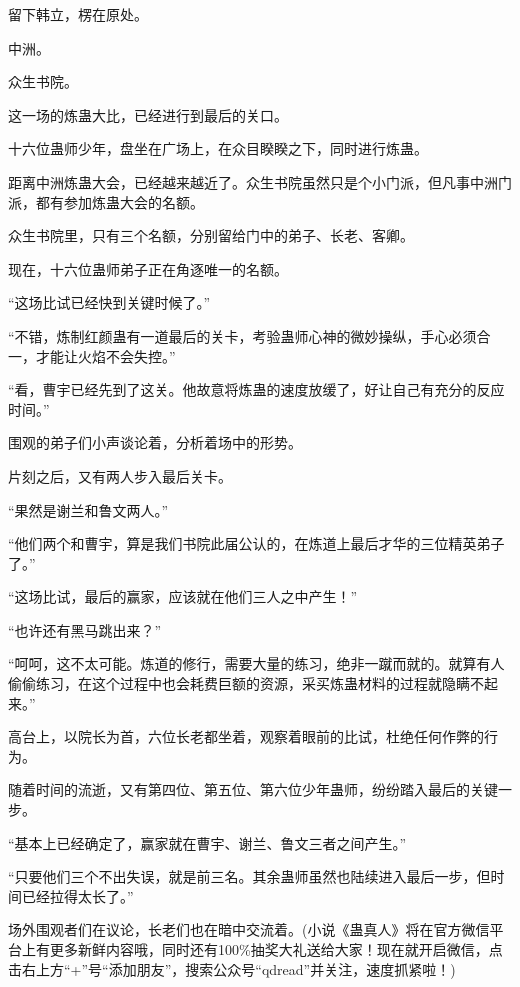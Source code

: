 \begin{this_body}
留下韩立，楞在原处。

中洲。

众生书院。

这一场的炼蛊大比，已经进行到最后的关口。

十六位蛊师少年，盘坐在广场上，在众目睽睽之下，同时进行炼蛊。

距离中洲炼蛊大会，已经越来越近了。众生书院虽然只是个小门派，但凡事中洲门派，都有参加炼蛊大会的名额。

众生书院里，只有三个名额，分别留给门中的弟子、长老、客卿。

现在，十六位蛊师弟子正在角逐唯一的名额。

“这场比试已经快到关键时候了。”

“不错，炼制红颜蛊有一道最后的关卡，考验蛊师心神的微妙操纵，手心必须合一，才能让火焰不会失控。”

“看，曹宇已经先到了这关。他故意将炼蛊的速度放缓了，好让自己有充分的反应时间。”

围观的弟子们小声谈论着，分析着场中的形势。

片刻之后，又有两人步入最后关卡。

“果然是谢兰和鲁文两人。”

“他们两个和曹宇，算是我们书院此届公认的，在炼道上最后才华的三位精英弟子了。”

“这场比试，最后的赢家，应该就在他们三人之中产生！”

“也许还有黑马跳出来？”

“呵呵，这不太可能。炼道的修行，需要大量的练习，绝非一蹴而就的。就算有人偷偷练习，在这个过程中也会耗费巨额的资源，采买炼蛊材料的过程就隐瞒不起来。”

高台上，以院长为首，六位长老都坐着，观察着眼前的比试，杜绝任何作弊的行为。

随着时间的流逝，又有第四位、第五位、第六位少年蛊师，纷纷踏入最后的关键一步。

“基本上已经确定了，赢家就在曹宇、谢兰、鲁文三者之间产生。”

“只要他们三个不出失误，就是前三名。其余蛊师虽然也陆续进入最后一步，但时间已经拉得太长了。”

场外围观者们在议论，长老们也在暗中交流着。(小说《蛊真人》将在官方微信平台上有更多新鲜内容哦，同时还有100\%抽奖大礼送给大家！现在就开启微信，点击右上方“+”号“添加朋友”，搜索公众号“qdread”并关注，速度抓紧啦！)

\end{this_body}

